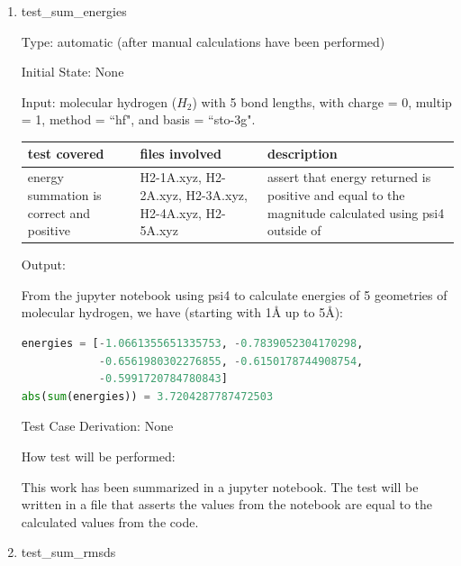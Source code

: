 \documentclass[12pt, titlepage]{article}
\begin{document}
\begin{enumerate}
	
\item{test\_sum\_energies\\}

Type: automatic (after manual calculations have been performed)

Initial State: None

Input: molecular hydrogen ($H_2$) with 5 bond lengths, with charge = 0, 
multip = 1, method = ``hf", and basis = ``sto-3g".

\begin{table}[H]
	\begin{adjustwidth}{-0.5in}{-0.5in}
	\begin{center}
	\begin{tabular}{p{4cm}p{3cm}p{8cm}}
		\toprule
		test covered & files involved & description \\
		\midrule
		energy summation is correct and positive & H2-1A.xyz, H2-2A.xyz, 
		H2-3A.xyz, H2-4A.xyz, H2-5A.xyz & assert that energy returned is 
		positive and equal to the magnitude calculated using psi4 outside of 
		\progname{} \\
	\end{tabular}
	\end{center}
	\end{adjustwidth}
\end{table}

Output: 

From the jupyter notebook using psi4 to calculate energies of 5 geometries of 
molecular hydrogen, we have (starting with 1\AA{} up to 5\AA):

\begin{lstlisting}[language=python, showstringspaces=false]
energies = [-1.0661355651335753, -0.7839052304170298,
            -0.6561980302276855, -0.6150178744908754,
            -0.5991720784780843]
abs(sum(energies)) = 3.7204287787472503
\end{lstlisting}

Test Case Derivation: None

How test will be performed: 

This work has been summarized in a jupyter notebook. The test will be written 
in a file that asserts the values from the notebook are equal to the calculated 
values from the \progname{} code.

\item{test\_sum\_rmsds\\}


\end{enumerate}
\end{document}
